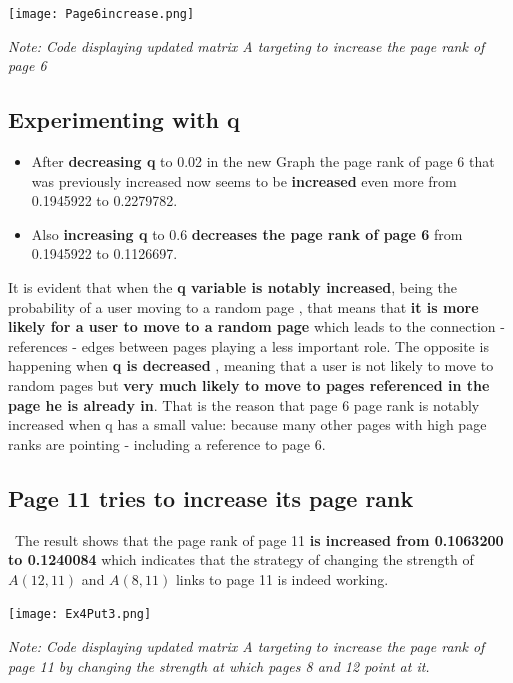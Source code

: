 \documentclass{article}
\begin{document}
\begin{tcolorbox}[colback=gray!10, colframe=gray!80, width=\textwidth, sharp corners]
    \centering 
    \texttt{[image: Page6increase.png]}     

    \vspace{0.2cm} 
    
    \small\textit{Note: Code displaying updated matrix A targeting to increase the page rank of page 6}
\end{tcolorbox}

\subsection{Experimenting with q}
\begin{itemize}
  
\item After \textbf{decreasing q} to 0.02 in the new Graph the page rank of page 6 that was previously increased now seems to be \textbf{increased}  even more from 0.1945922 to 0.2279782.
\item Also \textbf{increasing q} to 0.6 \textbf{decreases the page rank of page 6} from 0.1945922 to 0.1126697.
\end{itemize}
It is evident that when the \textbf{q variable is notably increased}, being the probability of a user moving to a random page , that means that \textbf{it is more likely for a user to move to a random page} which leads to the connection - references - edges between pages playing a less important role. The opposite is happening when \textbf{q is decreased} , meaning that a user is not likely to move to random pages but \textbf{very much likely to move to pages referenced in the page he is already in}. That is the reason that page 6 page rank is notably increased when q has a small value: because many other pages with high page ranks are pointing - including a reference to page 6.

\subsection{Page 11 tries to increase its page rank}\
The result shows that the page rank of page 11 \textbf{is increased from 0.1063200 to 0.1240084} which indicates that 
the strategy of changing the strength of  $A(12,11)$ and $A(8,11)$ links to page 11 is indeed working. 
\begin{tcolorbox}[colback=gray!10, colframe=gray!80, width=\textwidth, sharp corners]
    \centering 
    \texttt{[image: Ex4Put3.png]}     

    \vspace{0.2cm} 
    
    \small\textit{Note: Code displaying updated matrix A targeting to increase the page rank of page 11 by changing the strength at which pages 8 and 12 point at it.}
\end{tcolorbox}
\vspace{0.3cm}
\end{document}
